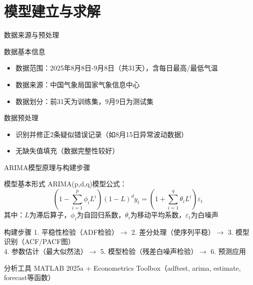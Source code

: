 \section{模型建立与求解}
\begin{frame}{数据来源与预处理}
    \begin{block}{数据基本信息}
        \begin{itemize}
            \item 数据范围：2025年8月8日-9月8日（共31天），含每日最高/最低气温
            \item 数据来源：中国气象局国家气象信息中心
            \item 数据划分：前31天为训练集，9月9日为测试集
        \end{itemize}
    \end{block}
    \begin{block}{数据预处理}
        \begin{itemize}
            \item 识别并修正2条疑似错误记录（如8月15日异常波动数据）
            \item 无缺失值填充（数据完整性较好）
        \end{itemize}
    \end{block}
\end{frame}

\begin{frame}{ARIMA模型原理与构建步骤}
    \begin{block}{模型基本形式}
        ARIMA(p,d,q)模型公式：\\
        \[
        \left(1-\sum_{i=1}^{p} \phi_{i} L^{i}\right)(1-L)^{d} y_{t}=\left(1+\sum_{i=1}^{q} \theta_{i} L^{i}\right) \varepsilon_{t}
        \]
        其中：$L$为滞后算子，$\phi_i$为自回归系数，$\theta_i$为移动平均系数，$\varepsilon_t$为白噪声
    \end{block}
    \begin{block}{构建步骤}
        1. 平稳性检验（ADF检验）$\to$ 2. 差分处理（使序列平稳）$\to$ 3. 模型识别（ACF/PACF图）\\
        4. 参数估计（最大似然法）$\to$ 5. 模型检验（残差白噪声检验）$\to$ 6. 预测应用
    \end{block}
    \begin{block}{分析工具}
        MATLAB 2025a + Econometrics Toolbox（adftest, arima, estimate, forecast等函数）
    \end{block}
\end{frame}

